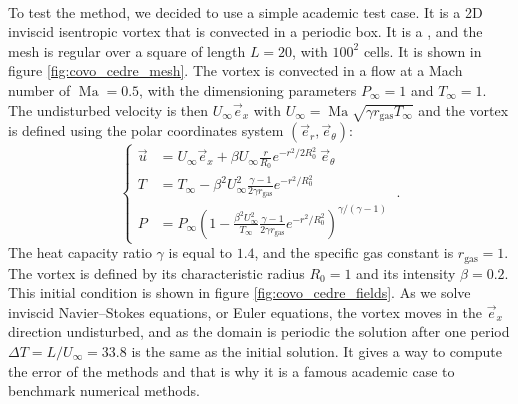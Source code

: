     \paragraph{}
    To test the method, we decided to use a simple academic test case.
    It is a 2D inviscid isentropic vortex that is convected in a periodic box.
    It is a , and the mesh is regular over a square of length $L = 20$, with $100^2$ cells.
    It is shown in figure \ref{fig:covo_cedre_mesh}.
    The vortex is convected in a flow at a Mach number of $\operatorname{Ma} = 0.5$, with the dimensioning parameters $P_\infty = 1$ and $T_\infty = 1$.
    The undisturbed velocity is then $U_\infty \vec{e}_x$ with $U_\infty = \operatorname{Ma} \sqrt{\gamma r_\textrm{gas} T_\infty}$ and the vortex is defined using the polar coordinates system $\left(\vec{e}_r, \vec{e}_\theta\right)$:
    \begin{equation}
      \left\{\begin{aligned}
        \vec{u} &= U_\infty \vec{e}_x + \beta U_\infty \frac{r}{R_0} e^{-r^2 / 2 R_0^2} \ \vec{e}_\theta \\[10pt]
        T &= T_\infty - \beta^2 U_\infty^2 \frac{\gamma - 1}{2 \gamma r_\textrm{gas}} e^{-r^2 / R_0^2} \\[10pt]
        P &= P_\infty \left( 1 - \frac{\beta^2 U_\infty^2}{T_\infty} \frac{\gamma - 1}{2 \gamma r_\textrm{gas}} e^{-r^2 / R_0^2} \right)^{\gamma/\left(\gamma - 1\right)}
      \end{aligned}\right. \ .
    \end{equation}
    The heat capacity ratio $\gamma$ is equal to $1.4$, and the specific gas constant is $r_\textrm{gas} = 1$.
    The vortex is defined by its characteristic radius $R_0 = 1$ and its intensity $\beta = 0.2$.
    This initial condition is shown in figure \ref{fig:covo_cedre_fields}.
    As we solve inviscid Navier--Stokes equations, or Euler equations, the vortex moves in the $\vec{e}_x$ direction undisturbed, and as the domain is periodic the solution after one period $\Delta T = L/U_\infty = 33.8$ is the same as the initial solution.
    It gives a way to compute the error of the methods and that is why it is a famous academic case to benchmark numerical methods.

